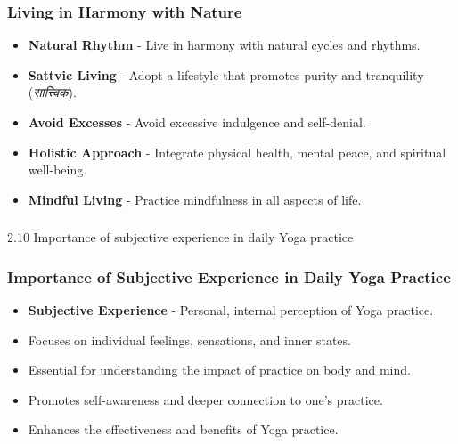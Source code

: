 \begin{frame}[fragile]\frametitle{Living in Harmony with Nature}

      \begin{itemize}
		\item \textbf{Natural Rhythm} - Live in harmony with natural cycles and rhythms.
		\item \textbf{Sattvic Living} - Adopt a lifestyle that promotes purity and tranquility (\textit{सात्त्विक}).
		\item \textbf{Avoid Excesses} - Avoid excessive indulgence and self-denial.
		\item \textbf{Holistic Approach} - Integrate physical health, mental peace, and spiritual well-being.
		\item \textbf{Mindful Living} - Practice mindfulness in all aspects of life.
	  \end{itemize}

\end{frame}


\begin{frame}[fragile]\frametitle{}
\begin{center}
{\Large 2.10  Importance of subjective experience in daily Yoga practice}
\end{center}
\end{frame}

\begin{frame}[fragile]\frametitle{Importance of Subjective Experience in Daily Yoga Practice}

      \begin{itemize}
		\item \textbf{Subjective Experience} - Personal, internal perception of Yoga practice.
		\item Focuses on individual feelings, sensations, and inner states.
		\item Essential for understanding the impact of practice on body and mind.
		\item Promotes self-awareness and deeper connection to one’s practice.
		\item Enhances the effectiveness and benefits of Yoga practice.
	  \end{itemize}

\end{frame}

